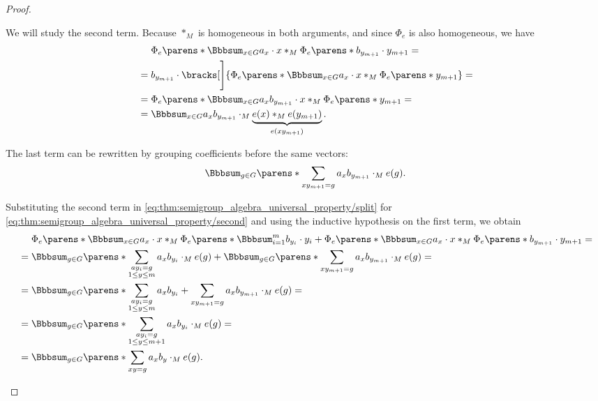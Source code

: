 \begin{proof}
\begin{itemize}
    We will study the second term. Because \( \ast_M \) is homogeneous in both arguments, and since \( \Phi_e \) is also homogeneous, we have
    \begin{align*}
      &\phantom{{}={}}
      \Phi_e\parens*{ \Bbbsum_{x \in G} a_x \cdot x } \ast_M \Phi_e\parens*{ b_{y_{m+1}} \cdot y_{m+1} }
      = \\ &=
      b_{y_{m+1}} \cdot \bracks[\Bigg]{ \Phi_e\parens*{ \Bbbsum_{x \in G} a_x \cdot x } \ast_M \Phi_e\parens*{ y_{m+1} } }
      = \\ &=
      \Phi_e\parens*{ \Bbbsum_{x \in G} a_x b_{y_{m+1}} \cdot x } \ast_M \Phi_e\parens*{ y_{m+1} }
      = \\ &=
      \Bbbsum_{x \in G} a_x b_{y_{m+1}} \cdot_M \underbrace{e(x) \ast_M e(y_{m+1})}_{e(xy_{m+1})}.
    \end{align*}

    The last term can be rewritten by grouping coefficients before the same vectors:
    \begin{equation}\label{eq:thm:semigroup_algebra_universal_property/second}
      \Bbbsum_{g \in G} \parens*{ \sum_{xy_{m+1} = g} a_x b_{y_{m+1}} } \cdot_M e(g).
    \end{equation}

    Substituting the second term in \eqref{eq:thm:semigroup_algebra_universal_property/split} for \eqref{eq:thm:semigroup_algebra_universal_property/second} and using the inductive hypothesis on the first term, we obtain
    \begin{align*}
      &\phantom{{}={}}
      \Phi_e\parens*{ \Bbbsum_{x \in G} a_x \cdot x } \ast_M \Phi_e\parens*{ \Bbbsum_{i=1}^m b_{y_i} \cdot y_i } + \Phi_e\parens*{ \Bbbsum_{x \in G} a_x \cdot x } \ast_M \Phi_e\parens*{ b_{y_{m+1}} \cdot y_{m+1} }
      = \\ &=
      \Bbbsum_{g \in G} \parens*{ \sum_{\substack{a y_i = g \\ 1 \leq y \leq m}} a_x b_{y_i} } \cdot_M e(g) + \Bbbsum_{g \in G} \parens*{ \sum_{xy_{m+1} = g} a_x b_{y_{m+1}} } \cdot_M e(g)
      = \\ &=
      \Bbbsum_{g \in G} \parens*{ \sum_{\substack{a y_i = g \\ 1 \leq y \leq m}} a_x b_{y_i} + \sum_{xy_{m+1} = g} a_x b_{y_{m+1}} } \cdot_M e(g)
      = \\ &=
      \Bbbsum_{g \in G} \parens*{ \sum_{\substack{a y_i = g \\ 1 \leq y \leq m + 1}} a_x b_{y_i} } \cdot_M e(g)
      = \\ &=
      \Bbbsum_{g \in G} \parens*{ \sum_{x y = g} a_x b_y } \cdot_M e(g).
    \end{align*}
  \end{itemize}


\end{proof}
